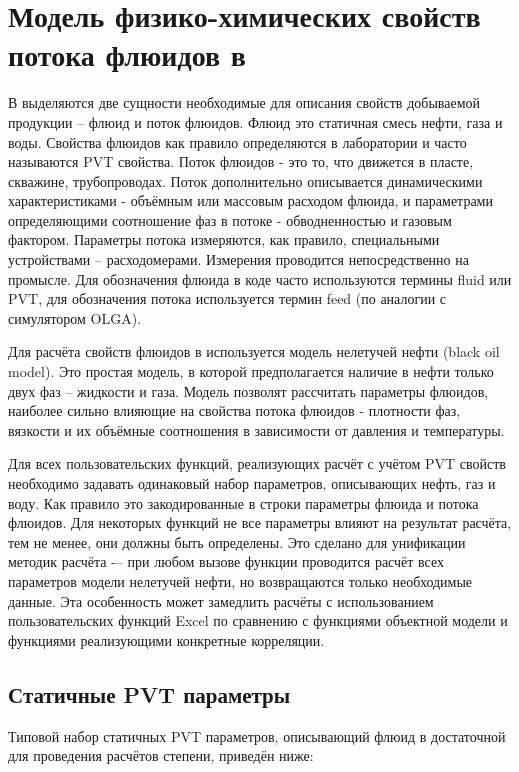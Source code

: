 \section{Модель физико-химических свойств потока флюидов в \unf{}}

В \unf{} выделяются две сущности необходимые для описания свойств добываемой продукции -- флюид и поток флюидов. Флюид это статичная смесь нефти, газа и воды. Свойства флюидов как правило определяются в лаборатории и часто называются PVT свойства. Поток флюидов - это то, что движется в пласте, скважине, трубопроводах. Поток дополнительно описывается динамическими характеристиками - объёмным или массовым расходом флюида, и параметрами определяющими соотношение фаз в потоке - обводненностью и газовым фактором. Параметры потока измеряются, как правило, специальными устройствами -- расходомерами. Измерения проводится непосредственно на промысле. Для обозначения флюида в коде часто используются термины fluid или PVT, для обозначения потока используется термин feed (по аналогии с симулятором OLGA). 

Для расчёта свойств флюидов в \unf{} используется модель нелетучей нефти (black oil model). Это простая модель, в которой предполагается наличие в нефти только двух фаз -- жидкости и газа. Модель позволят рассчитать параметры флюидов, наиболее сильно влияющие на свойства потока флюидов - плотности фаз, вязкости и их объёмные соотношения в зависимости от давления и температуры.


Для всех пользовательских функций, реализующих расчёт с учётом PVT свойств необходимо задавать одинаковый набор параметров, описывающих нефть, газ и воду. Как правило это закодированные в строки параметры флюида и потока флюидов. Для некоторых  функций не все параметры  влияют на результат расчёта, тем не менее, они должны быть определены. Это сделано для унификации методик расчёта -– при любом вызове функции проводится расчёт всех параметров модели нелетучей нефти, но возвращаются только необходимые данные. Эта особенность может замедлить расчёты с использованием пользовательских функций Excel по сравнению с функциями объектной модели \unf{} и функциями реализующими конкретные корреляции.
 
\subsection{Статичные PVT параметры}
Типовой  набор статичных PVT параметров, описывающий флюид в достаточной для проведения расчётов степени, приведён ниже:


